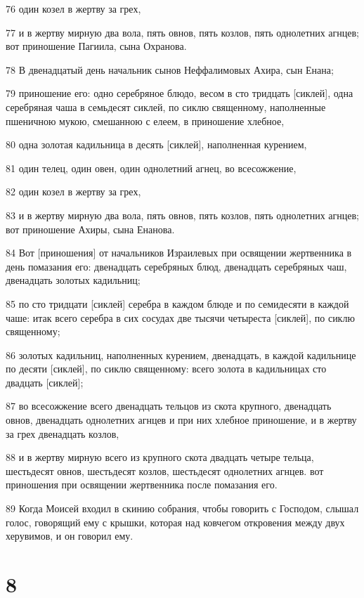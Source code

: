 \par 76 один козел в жертву за грех,
\par 77 и в жертву мирную два вола, пять овнов, пять козлов, пять однолетних агнцев; вот приношение Пагиила, сына Охранова.
\par 78 В двенадцатый день начальник сынов Неффалимовых Ахира, сын Енана;
\par 79 приношение его: одно серебряное блюдо, весом в сто тридцать [сиклей], одна серебряная чаша в семьдесят сиклей, по сиклю священному, наполненные пшеничною мукою, смешанною с елеем, в приношение хлебное,
\par 80 одна золотая кадильница в десять [сиклей], наполненная курением,
\par 81 один телец, один овен, один однолетний агнец, во всесожжение,
\par 82 один козел в жертву за грех,
\par 83 и в жертву мирную два вола, пять овнов, пять козлов, пять однолетних агнцев; вот приношение Ахиры, сына Енанова.
\par 84 Вот [приношения] от начальников Израилевых при освящении жертвенника в день помазания его: двенадцать серебряных блюд, двенадцать серебряных чаш, двенадцать золотых кадильниц;
\par 85 по сто тридцати [сиклей] серебра в каждом блюде и по семидесяти в каждой чаше: итак всего серебра в сих сосудах две тысячи четыреста [сиклей], по сиклю священному;
\par 86 золотых кадильниц, наполненных курением, двенадцать, в каждой кадильнице по десяти [сиклей], по сиклю священному: всего золота в кадильницах сто двадцать [сиклей];
\par 87 во всесожжение всего двенадцать тельцов из скота крупного, двенадцать овнов, двенадцать однолетних агнцев и при них хлебное приношение, и в жертву за грех двенадцать козлов,
\par 88 и в жертву мирную всего из крупного скота двадцать четыре тельца, шестьдесят овнов, шестьдесят козлов, шестьдесят однолетних агнцев. вот приношения при освящении жертвенника после помазания его.
\par 89 Когда Моисей входил в скинию собрания, чтобы говорить с Господом, слышал голос, говорящий ему с крышки, которая над ковчегом откровения между двух херувимов, и он говорил ему.

\chapter{8}

